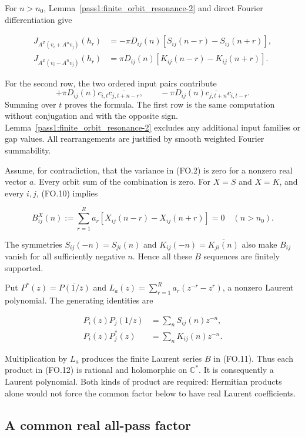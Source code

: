 For \(n>n_0\), Lemma~\ref{pass1:finite_orbit_resonance-2} and direct Fourier differentiation give

\[
 \begin{split}
 J_{A^{\mathbb Z}(v_i+A^nv_j)}(h_r)
   &=-\pi D_{ij}(n)[S_{ij}(n-r)-S_{ij}(n+r)],\\
 J_{A^{\mathbb Z}(v_i-A^nv_j)}(h_r)
   &= \pi D_{ij}(n)[K_{ij}(n-r)-K_{ij}(n+r)].
 \end{split}
\tag{FO.10}
\]

For the second row, the two ordered input pairs contribute \[
 +\pi D_{ij}(n)c_{i,t}\overline{c_{j,t+n-r}},\qquad
 -\pi D_{ij}(n)\overline{c_{j,t+n}}c_{i,t-r}.
\] Summing over \(t\) proves the formula. The first row is the same computation without conjugation and with the opposite sign. Lemma~\ref{pass1:finite_orbit_resonance-2} excludes any additional input families or gap values. All rearrangements are justified by smooth weighted Fourier summability.

Assume, for contradiction, that the variance in (FO.2) is zero for a nonzero real vector \(a\). Every orbit sum of the combination is zero. For \(X=S\) and \(X=K\), and every \(i,j\), (FO.10) implies

\[
 B_{ij}^{X}(n):=\sum_{r=1}^R a_r[X_{ij}(n-r)-X_{ij}(n+r)]=0
       \quad(n>n_0).
\tag{FO.11}
\]

The symmetries \(S_{ij}(-n)=S_{ji}(n)\) and \(K_{ij}(-n)=\overline{K_{ji}(n)}\) also make \(B_{ij}\) vanish for all sufficiently negative \(n\). Hence all these \(B\) sequences are finitely supported.

Put \(P^*(z)=\overline{P(1/\bar z)}\) and \(L_a(z)=\sum_{r=1}^R a_r(z^{-r}-z^r)\), a nonzero Laurent polynomial. The generating identities are

\[
 \begin{split}
 P_i(z)P_j(1/z)&=\sum_n S_{ij}(n)z^{-n},\\
 P_i(z)P_j^*(z)&=\sum_n K_{ij}(n)z^{-n}.
 \end{split}
\tag{FO.12}
\]

Multiplication by \(L_a\) produces the finite Laurent series \(B\) in (FO.11). Thus each product in (FO.12) is rational and holomorphic on \(\mathbb C^*\). It is consequently a Laurent polynomial. Both kinds of product are required: Hermitian products alone would not force the common factor below to have real Laurent coefficients.

\hypertarget{a-common-real-all-pass-factor}{%
\subsection{A common real all-pass factor}\label{a-common-real-all-pass-factor}}

